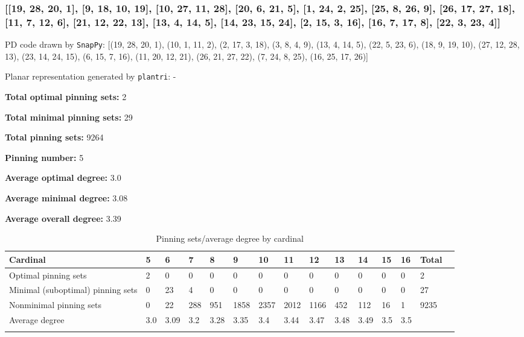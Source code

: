 \documentclass{article}%
\begin{document}
\newpage

\subsubsection{[[19, 28, 20, 1], [9, 18, 10, 19], [10, 27, 11, 28], [20, 6, 21, 5], [1, 24, 2, 25], [25, 8, 26, 9], [26, 17, 27, 18], [11, 7, 12, 6], [21, 12, 22, 13], [13, 4, 14, 5], [14, 23, 15, 24], [2, 15, 3, 16], [16, 7, 17, 8], [22, 3, 23, 4]]}

{\small\noindent PD code drawn by \texttt{SnapPy}: [(19, 28, 20, 1), (10, 1, 11, 2), (2, 17, 3, 18), (3, 8, 4, 9), (13, 4, 14, 5), (22, 5, 23, 6), (18, 9, 19, 10), (27, 12, 28, 13), (23, 14, 24, 15), (6, 15, 7, 16), (11, 20, 12, 21), (26, 21, 27, 22), (7, 24, 8, 25), (16, 25, 17, 26)]}

{\small\noindent Planar representation generated by \texttt{plantri}: -}

\begin{multicols}{2}
{\normalsize \noindent\textbf{Total optimal pinning sets:} 2

\noindent\textbf{Total minimal pinning sets:} 29

\noindent\textbf{Total pinning sets:} 9264

\noindent\textbf{Pinning number:} 5

}
\columnbreak

{\normalsize \noindent\textbf{Average optimal degree:} 3.0

\noindent\textbf{Average minimal degree:} 3.08

\noindent\textbf{Average overall degree:} 3.39

}
\end{multicols}

\begin{table}[ht]
	\caption{Pinning sets/average degree by cardinal}
	\centering
	\renewcommand{\arraystretch}{1.5}
	\begin{tabularx}{\textwidth}{lXXXXXXXXXXXXXX}
		\toprule
			Cardinal & 5 & 6 & 7 & 8 & 9 & 10 & 11 & 12 & 13 & 14 & 15 & 16 & Total\\
			\hline
			Optimal pinning sets & 2 & 0 & 0 & 0 & 0 & 0 & 0 & 0 & 0 & 0 & 0 & 0 & 2 \\
			Minimal (suboptimal) pinning sets & 0 & 23 & 4 & 0 & 0 & 0 & 0 & 0 & 0 & 0 & 0 & 0 & 27 \\
			Nonminimal pinning sets & 0 & 22 & 288 & 951 & 1858 & 2357 & 2012 & 1166 & 452 & 112 & 16 & 1 & 9235 \\
			Average degree & 3.0 & 3.09 & 3.2 & 3.28 & 3.35 & 3.4 & 3.44 & 3.47 & 3.48 & 3.49 & 3.5 & 3.5 &  \\
		\bottomrule \\ 
	\end{tabularx}
\end{table}
\end{document}
